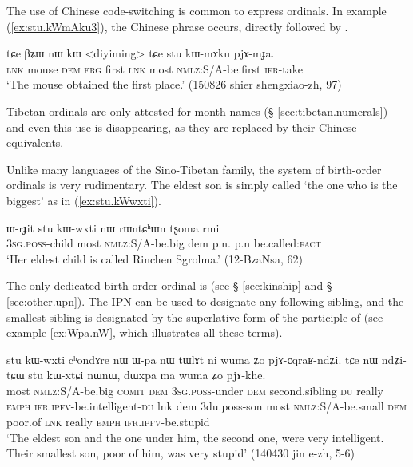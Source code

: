 The use of Chinese code-switching is common to express ordinals. In example (\ref{ex:stu.kWmAku3}), the Chinese phrase  occurs, directly followed by .

\begin{exe}
\ex  \label{ex:stu.kWmAku3}
\gll tɕe βʑɯ nɯ kɯ <diyiming> tɕe stu kɯ-mɤku pjɤ-mɟa. \\
 \textsc{lnk} mouse \textsc{dem} \textsc{erg} first \textsc{lnk} most \textsc{nmlz}:S/A-be.first \textsc{ifr}-take \\
\glt `The mouse obtained the first place.' (150826 shier shengxiao-zh, 97)
\end{exe}

Tibetan ordinals are only attested for month names (§ \ref{sec:tibetan.numerals}) and even this use is disappearing, as they are replaced by their Chinese equivalents.

Unlike many languages of the Sino-Tibetan family, the system of birth-order ordinals is very rudimentary. The eldest son is simply called  `the one who is the biggest' as in (\ref{ex:stu.kWwxti}).

\begin{exe}
\ex  \label{ex:stu.kWwxti}
\gll ɯ-rɟit stu kɯ-wxti nɯ rɯntɕʰɯn tʂoma rmi\\
\textsc{3sg}.\textsc{poss}-child most \textsc{nmlz}:S/A-be.big dem p.n. p.n be.called:\textsc{fact}\\
\glt `Her eldest child is called Rinchen Sgrolma.' (12-BzaNsa, 62)
\end{exe}

The only dedicated birth-order ordinal is  (see § \ref{sec:kinship} and § \ref{sec:other.upn}). The IPN  can be used to designate any following sibling, and the smallest sibling is designated by the superlative form of the participle of  (see example \ref{ex:Wpa.nW}, which illustrates all these terms).

\begin{exe}
\ex  \label{ex:Wpa.nW}
\gll stu kɯ-wxti cʰondɤre nɯ ɯ-pa nɯ tɯlɤt ni wuma ʑo pjɤ-ɕqraʁ-ndʑi. tɕe nɯ ndʑi-tɕɯ stu kɯ-xtɕi nɯnɯ, dɯxpa ma wuma ʑo pjɤ-khe. \\
most \textsc{nmlz}:S/A-be.big \textsc{comit} \textsc{dem} \textsc{3sg}.\textsc{poss}-under \textsc{dem} second.sibling \textsc{du} really \textsc{emph} \textsc{ifr}.\textsc{ipfv}-be.intelligent-\textsc{du} lnk dem 3du.poss-son most \textsc{nmlz}:S/A-be.small \textsc{dem} poor.of \textsc{lnk} really \textsc{emph} \textsc{ifr}.\textsc{ipfv}-be.stupid \\
\glt `The eldest son and the one under him, the second one, were very intelligent. Their smallest son, poor of him, was very stupid' (140430 jin e-zh, 5-6) 
\end{exe}
 
